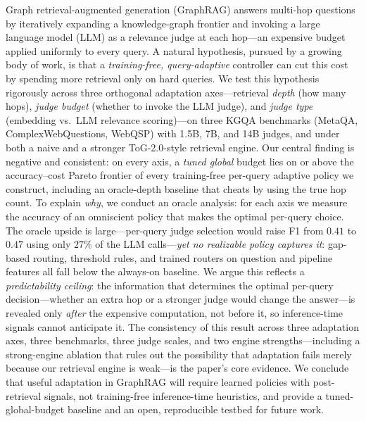 Graph retrieval-augmented generation (GraphRAG) answers multi-hop questions by iteratively expanding a knowledge-graph frontier and invoking a large language model (LLM) as a relevance judge at each hop---an expensive budget applied uniformly to every query. A natural hypothesis, pursued by a growing body of work, is that a \emph{training-free, query-adaptive} controller can cut this cost by spending more retrieval only on hard queries. We test this hypothesis rigorously across three orthogonal adaptation axes---retrieval \emph{depth} (how many hops), \emph{judge budget} (whether to invoke the LLM judge), and \emph{judge type} (embedding vs.\ LLM relevance scoring)---on three KGQA benchmarks (MetaQA, ComplexWebQuestions, WebQSP) with 1.5B, 7B, and 14B judges, and under both a naive and a stronger ToG-2.0-style retrieval engine. Our central finding is negative and consistent: on every axis, a \emph{tuned global} budget lies on or above the accuracy--cost Pareto frontier of every training-free per-query adaptive policy we construct, including an oracle-depth baseline that cheats by using the true hop count. To explain \emph{why}, we conduct an oracle analysis: for each axis we measure the accuracy of an omniscient policy that makes the optimal per-query choice. The oracle upside is large---per-query judge selection would raise F1 from $0.41$ to $0.47$ using only $27\%$ of the LLM calls---\emph{yet no realizable policy captures it}: gap-based routing, threshold rules, and trained routers on question and pipeline features all fall below the always-on baseline. We argue this reflects a \emph{predictability ceiling}: the information that determines the optimal per-query decision---whether an extra hop or a stronger judge would change the answer---is revealed only \emph{after} the expensive computation, not before it, so inference-time signals cannot anticipate it. The consistency of this result across three adaptation axes, three benchmarks, three judge scales, and two engine strengths---including a strong-engine ablation that rules out the possibility that adaptation fails merely because our retrieval engine is weak---is the paper's core evidence. We conclude that useful adaptation in GraphRAG will require learned policies with post-retrieval signals, not training-free inference-time heuristics, and provide a tuned-global-budget baseline and an open, reproducible testbed for future work.
